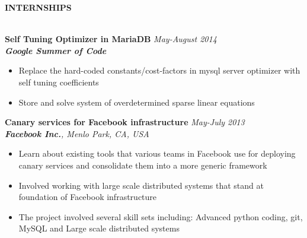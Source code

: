 \documentclass[10pt]{article}
\newcommand{\cvsectiontitle}[1]{
    		\colorbox{gray!40}{%
        \begin{minipage}{0.989\linewidth}%
            \vspace*{1pt}%
            \large\indent\textbf{#1}
            \vspace*{1pt}%
        \end{minipage}%
   		}\\[1mm]
		}
\begin{document}
\cvsectiontitle{INTERNSHIPS}
\textbf{Self Tuning Optimizer in MariaDB} \hfill \textit{May-August 2014} \\
\textbf{\textit{Google Summer of Code}}
\vspace{-0.2cm}
\begin{itemize}
\setlength{\itemsep}{0.1mm}
	\item Replace the hard-coded constants/cost-factors in mysql server optimizer with self tuning coefficients
	\item Store and solve system of overdetermined sparse linear equations
\end{itemize}
\vspace{-0.2cm}
\textbf{Canary services for Facebook infrastructure} \hfill \textit{May-July 2013} \\
\textit{\textbf{Facebook Inc.}, Menlo Park, CA, USA}
\vspace{-0.2cm}
\begin{itemize}
\setlength{\itemsep}{0.1mm}
	\item Learn about existing tools that various teams in Facebook use for deploying canary services and consolidate them into a more generic framework
	\item Involved working with large scale distributed systems that stand at foundation of Facebook infrastructure
	\item The project involved several skill sets including: Advanced python coding, git, MySQL and Large scale distributed systems
\end{itemize}
\end{document}
